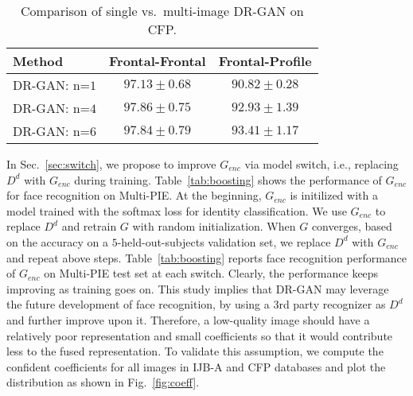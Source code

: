 \documentclass[10pt,journal,compsoc]{IEEEtran}
\begin{document}
\begin{table}[t!]
\small
\caption{\small{Comparison of single vs.~multi-image DR-GAN on CFP.}} 
\vspace{-3mm}
\label{tab:CFP_results_1}
\begin{center}
\begin{tabular}{ lcc}
\toprule 
Method & Frontal-Frontal & Frontal-Profile\\ \midrule
DR-GAN: n=$1$ & $97.13\pm0.68$ & $90.82\pm0.28$ \\ 
DR-GAN: n=$4$ & $97.86\pm0.75$ & $92.93\pm1.39$ \\ 
DR-GAN: n=$6$ & $97.84\pm0.79$ & $93.41\pm1.17$ \\ 
\bottomrule
\end{tabular}
\end{center}
\figvspace
\end{table}\begin{table}[t]
\begin{center}
\caption{\small Performance of  $G_{enc}$ on Multi-PIE when keep switching to $D_{d}$. At Epoch $0$, $G_{enc}$ is trained with only the softmax loss. }
\label{tab:boosting}
\small
{}
\end{center}\figvspace\vspace{-2mm}
\end{table}
In Sec.~\ref{sec:switch}, we propose to improve $G_{enc}$ via model switch, i.e., replacing $D^d$ with $G_{enc}$ during training. 
Table~\ref{tab:boosting} shows the performance of $G_{enc}$ for face recognition on Multi-PIE. 
At the beginning, $G_{enc}$ is initilized with a model trained with the softmax loss for identity classification. 
We use $G_{enc}$ to replace $D^d$ and retrain $G$ with random initialization.
When $G$ converges, based on the accuracy on a $5$-held-out-subjects validation set, we replace $D^d$ with $G_{enc}$ and repeat above steps. 
%
Table~\ref{tab:boosting} reports face recognition performance of $G_{enc}$ on Multi-PIE test set at each switch. 
Clearly, the performance keeps improving as training goes on.
This study implies that DR-GAN may leverage the future development of face recognition, by using a $3$rd party recognizer as $D^d$ and further improve upon it.
Therefore, a low-quality image should have a relatively poor representation and small coefficients so that it would contribute less to the fused representation.  
To validate this assumption, we compute the confident coefficients for all images in IJB-A and CFP databases and plot the distribution as shown in Fig.~\ref{fig:coeff}.
\end{document}
